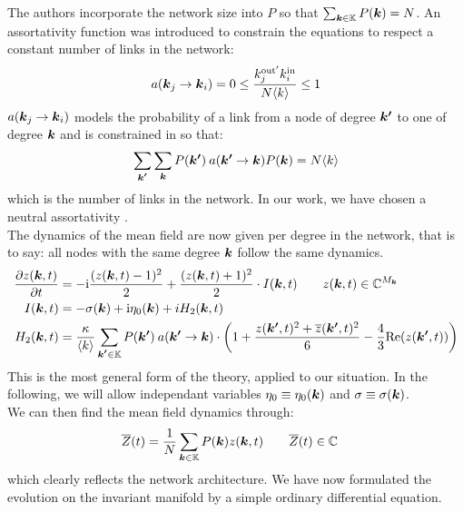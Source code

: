 The authors incorporate the network size into $P$ so that $\sum_{{\boldsymbol{k}} \in {\mathbb{K}}} P({\boldsymbol{k}}) = N$. An assortativity function was introduced to constrain the equations to respect a constant number of links in the network:
\begin{align}
a\left(\k_j \rightarrow \k_i \right) = 0 \leq \frac{k^{\rm{out}^{\prime}}_j k^{\rm{in}}_i}{N \kmean} \leq 1 \label{eq:assortativityfunction}
\end{align}
$a\left(\k_j \rightarrow \k_i \right)$ models the probability of a link from a node of degree ${\boldsymbol{k'}}$ to one of degree ${\boldsymbol{k}}$ and is constrained in \cite{Restrepo2014} so that:
\begin{align*}
\sum_{\kacc} \sum_{\k} P\left( \kacc \right) \: a\left(\kacc \rightarrow \k\right) P\left(\k\right) = N\langle k\rangle
\end{align*}
which is the number of links in the network. In our work, we have chosen a neutral assortativity \cite{OttAntonsen2017}. \\

The dynamics of the mean field are now given per degree in the network, that is to say: all nodes with the same degree ${\boldsymbol{k}}$ follow the same dynamics.
\begin{align}
\frac{\partial z(\k, t)}{\partial t} &= -\ic \frac{(z(\k, t)-1)^{2}}{2} + \frac{(z(\k, t)+1)^{2}}{2} \cdot I(\k, t) \qquad z(\k,t) \in \C^{M_\k} \nonumber \\
I(\k, t) &= -\sigma(\k) + \ic \eta_{0}(\k) + i H_2(\k,t) \label{eq:OttAntonsenSystemFull} \\
H_2(\k,t) &= \frac{\kappa}{\kmean} \sum_{\kacc \in \K} P\left(\kacc\right) \: a\left(\kacc \rightarrow \k\right) \cdot \left( 1 + \frac{z(\kacc, t)^2 + \overline{z}(\kacc, t)^2}{6} - \frac{4}{3} \Re(z(\kacc, t)) \right) \nonumber
\end{align}
This is the most general form of the theory, applied to our situation. In the following, we will allow independant variables $\eta_0 \equiv \eta_0({\boldsymbol{k}})$ and $\sigma \equiv \sigma({\boldsymbol{k}})$. \\

We can then find the mean field dynamics through:
\begin{align}
\overline{Z}(t) &= \frac{1}{N} \sum_{{\boldsymbol{k}} \in {\mathbb{K}}} P({\boldsymbol{k}}) z({\boldsymbol{k}}, t) \qquad \overline{Z}(t) \in {\mathbb{C}} \label{eq:OttAntonsenMeanField}
\end{align}
which clearly reflects the network architecture. We have now formulated the evolution on the invariant manifold by a simple ordinary differential equation. 


